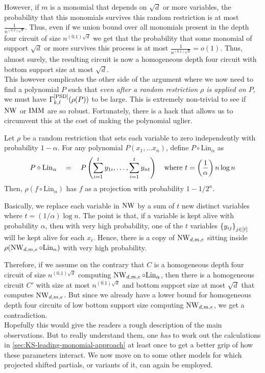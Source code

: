 However, if $m$ is a monomial that depends on $\sqrt{d}$ or more variables, the probability that this monomials survives this random restriction is at most $\frac{1}{n^{(0.2) \sqrt{d}}}$. Thus, even if we union bound over all monomials present in the depth four circuit of size $n^{(0.1)\sqrt{d}}$ we get
that the probability that some monomial of support $\sqrt{d}$ or more survives this process is at most $\frac{1}{n^{(0.1)\sqrt{d}}} = o(1)$. Thus, almost surely, the resulting circuit is now a homogeneous depth four circuit with bottom support size at most $\sqrt{d}$. \\

This however complicates the other side of the argument where we now need to find a polynomial $P$ such that \emph{even after a random restriction $\rho$ is applied on $P$}, we must have $\Gamma^{\mathrm{[PSD]}}_{k,\ell}(\rho(P))$ to be large. This is extremely non-trivial to see if $\operatorname{\mathrm{NW}}$ or $\operatorname{\mathrm{IMM}}$ are so robust. Fortunately, there is a hack that allows us to circumvent this at the cost of making the polynomial uglier. 

\begin{lemma*}
Let $\rho$ be a random restriction that sets each variable to zero independently with probability $1 - \alpha$. 
For any polynomial $P(x_1,\dots x_n)$, define $P \circ \mathrm{Lin}_\alpha$ as
\[
P \circ \mathrm{Lin}_\alpha \quad = \quad P\left(\sum_{i=1}^t y_{1i}, \ldots, \sum_{i=1}^t y_{nt}\right)\quad \text{where $t = \left(\frac{1}{\alpha}\right) n \log n$}
\]
Then, $\rho(f \circ \mathrm{Lin}_\alpha)$ has $f$ as a projection with probability $1 - 1/2^{n}$. 
\end{lemma*}

Basically, we replace each variable in $\operatorname{\mathrm{NW}}$ by a sum of $t$ new distinct variables where $t = (1/\alpha) \log n$. The point is that, if a variable is kept alive with probability $\alpha$, then with very high probability, one of the $t$ variables $\left\{y_{ij}\right\}_{j\in [t]}$ will be kept alive for each $x_i$. Hence, there is a copy of $\operatorname{\mathrm{NW}}_{d,m,e}$ sitting inside $\rho(\operatorname{\mathrm{NW}}_{d,m,e} \circ \mathrm{Lin}_\alpha)$ with very high probability. 

Therefore, if we assume on the contrary that $C$ is a homogeneous depth four circuit of size $n^{(0.1)\sqrt{d}}$ computing $\operatorname{\mathrm{NW}}_{d,m,e} \circ \mathrm{Lin}_\alpha$, then there is a homogeneous circuit $C'$ with size at most $n^{(0.1)\sqrt{d}}$ and bottom support size at most $\sqrt{d}$ that computes $\operatorname{\mathrm{NW}}_{d,m,e}$. But since we already have a lower bound for homogeneous depth four circuits of low bottom support size computing $\operatorname{\mathrm{NW}}_{d,m,e}$, we get a contradiction. \\

Hopefully this would give the readers a rough description of the main observations. But to really understand them, one \emph{has} to work out the calculations in \autoref{sec:KS-leading-monomial-approach} at least once to get a better grip of how these parameters interact. We now move on to some other models for which projected shifted partials, or variants of it, can again be employed. 


